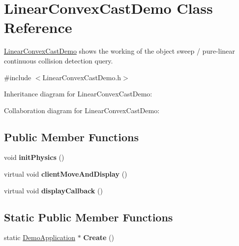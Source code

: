 \hypertarget{class_linear_convex_cast_demo}{\section{Linear\+Convex\+Cast\+Demo Class Reference}
\label{class_linear_convex_cast_demo}
}


\hyperlink{class_linear_convex_cast_demo}{Linear\+Convex\+Cast\+Demo} shows the working of the object sweep / pure-\/linear continuous collision detection query.  




{\ttfamily \#include $<$Linear\+Convex\+Cast\+Demo.\+h$>$}



Inheritance diagram for Linear\+Convex\+Cast\+Demo\+:


Collaboration diagram for Linear\+Convex\+Cast\+Demo\+:
\subsection*{Public Member Functions}
\begin{DoxyCompactItemize}
\item 
\hypertarget{class_linear_convex_cast_demo_a01aa66e6aa754c938f3c250ab7ebd664}{void {\bfseries init\+Physics} ()}\label{class_linear_convex_cast_demo_a01aa66e6aa754c938f3c250ab7ebd664}

\item 
\hypertarget{class_linear_convex_cast_demo_af9f0e7524f241558a6e42817a7d6babf}{virtual void {\bfseries client\+Move\+And\+Display} ()}\label{class_linear_convex_cast_demo_af9f0e7524f241558a6e42817a7d6babf}

\item 
\hypertarget{class_linear_convex_cast_demo_a0c193fd93d3b9c7f8e6b4eab009b669d}{virtual void {\bfseries display\+Callback} ()}\label{class_linear_convex_cast_demo_a0c193fd93d3b9c7f8e6b4eab009b669d}

\end{DoxyCompactItemize}
\subsection*{Static Public Member Functions}
\begin{DoxyCompactItemize}
\item 
\hypertarget{class_linear_convex_cast_demo_a0f995916d72b3ceca941f4dae5469890}{static \hyperlink{class_demo_application}{Demo\+Application} $\ast$ {\bfseries Create} ()}\label{class_linear_convex_cast_demo_a0f995916d72b3ceca941f4dae5469890}

\end{DoxyCompactItemize}


